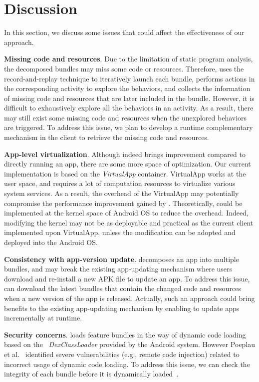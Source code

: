 \section{Discussion}
\label{sec:discussion}
In this section, we discuss some issues that could affect the effectiveness of our approach.

\noindent \textbf{Missing code and resources}. Due to the limitation of static program  analysis, the decomposed bundles may miss some code or resources. Therefore, \nickName{} uses the record-and-replay technique to iteratively launch each bundle, performs actions in the corresponding activity to explore the  behaviors, and collects the information of missing code and resources that are later included in the bundle. However, it is difficult to exhaustively explore all the behaviors in an activity. As a result, there may still exist some missing code and resources when the unexplored behaviors are triggered. To address this issue, we plan to  develop a runtime complementary mechanism in the \nickName{} client to retrieve the missing code and resources.

\noindent \textbf{App-level virtualization}. Although \nickName{} indeed brings improvement compared to directly running an app, there are some more space of optimization. Our current implementation is based on the \textit{VirtualApp} container. VirtualApp works at the user space, and requires a lot of computation resources to virtualize various system services. As a result, the overhead of the VirtualApp may potentially compromise the performance improvement gained by \nickName{}. Theoretically, \nickName{} could be implemented at the kernel space of Android OS  to reduce the overhead. Indeed, modifying the  kernel may not be as deployable and practical as the current \nickName{} client implemented upon VirtualApp, unless the modification can be adopted and deployed into the Android OS.


\noindent \textbf{Consistency with app-version  update}. \nickName{} decomposes an app into multiple bundles, and may break the existing app-updating mechanism where users download and re-install a new APK file to update an app. To address this issue, \nickName{} can download the latest bundles that contain the changed code and resources when a new version of the app is released. Actually, such an approach could bring benefits to the existing app-updating mechanism by enabling to update apps incrementally at runtime.


\noindent \textbf{Security concerns}. \nickName{} loads feature bundles in the way of dynamic code loading based on the ~\textit{DexClassLoader} provided by the Android system. However Poeplau et al.~\cite{NDSS14Poeplau} identified severe vulnerabilities (e.g., remote code injection) related to incorrect usage of dynamic code loading. To address this issue, we can check the integrity of each bundle before it is dynamically loaded~\cite{ACSAC15Falsina}.

